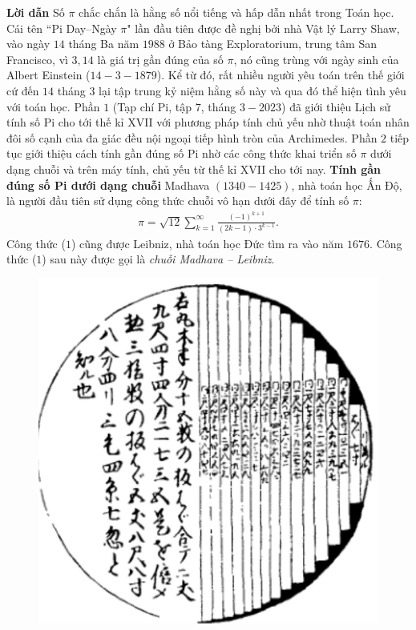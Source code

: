 \begin{multicols}{2}
	\textbf{\color{lichsutoanhoc}Lời dẫn}
	\vskip 0.1cm
	Số $\pi$ chắc chắn là hằng số nổi tiếng và hấp dẫn nhất trong Toán học. 
	\vskip 0.1cm
	Cái tên ``Pi Day--Ngày $\pi$" lần đầu tiên được đề nghị bởi nhà Vật lý Larry Shaw, vào ngày $14$ tháng Ba năm $1988$ ở Bảo tàng Exploratorium, trung tâm San Francisco, vì $3{,}14$ là giá trị gần đúng của số $\pi$, nó cũng trùng với ngày sinh của Albert Einstein ($14-3-1879$). Kể từ đó, rất nhiều người yêu toán trên thế giới cứ đến $14$ tháng $3$ lại tập trung kỷ niệm hằng số này và qua đó thể hiện tình yêu với toán học. 
	\vskip 0.1cm
	Phần $1$ (Tạp chí Pi, tập $7$, tháng $3-2023$) đã giới thiệu Lịch sử tính số Pi cho tới thế kỉ XVII với phương pháp tính chủ yếu nhờ thuật toán nhân đôi số cạnh của đa giác đều nội ngoại tiếp hình tròn của Archimedes. Phần $2$ tiếp tục giới thiệu cách tính gần đúng số Pi nhờ các công thức khai triển số $\pi$ dưới dạng chuỗi và trên máy tính, chủ yếu từ thế kỉ XVII cho tới nay.
	\vskip 0.1cm
	\textbf{\color{lichsutoanhoc}Tính gần đúng số Pi dưới dạng chuỗi}
	\vskip 0.1cm
	Madhava $(1340-1425)$, nhà toán học Ấn Độ, là người đầu tiên sử dụng công thức chuỗi vô hạn dưới đây để tính số $\pi$: 
	\begin{align*}
		\pi  = \sqrt {12} \sum\limits_{k = 1}^\infty  {\frac{{{{\left( { - 1} \right)}^{k + 1}}}}{{\left( {2k - 1} \right) \cdot {3^{k - 1}}}}}. \tag{$1$}
	\end{align*}
	Công thức ($1$) cũng được Leibniz, nhà toán học Đức tìm ra vào năm $1676$. Công thức ($1$) sau này được gọi là \textit{chuỗi Madhava -- Leibniz}.
	\begin{figure}[H]
		\vspace*{-5pt}
		\centering
		\captionsetup{labelformat= empty, justification=centering}
		\includegraphics[width= 1\linewidth]{1}

\end{figure}
\end{multicols}
